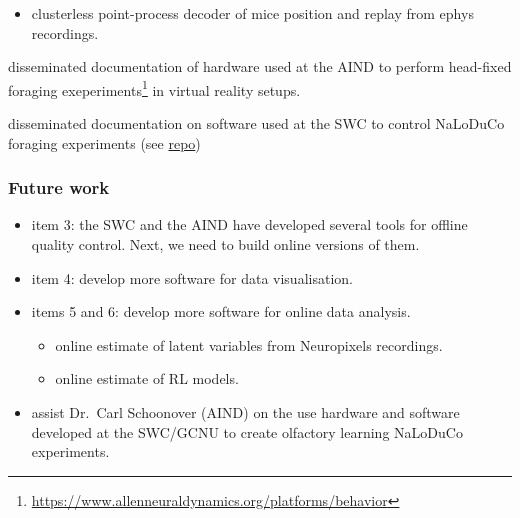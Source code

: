 \documentclass{beamer}
\begin{document}
\begin{frame}
\begin{itemize}
{\begin{itemize}
            \item clusterless point-process decoder of mice position and replay
                from ephys recordings.
    
        \end{itemize}
    
        \item  disseminated documentation of hardware used at the AIND to perform
            head-fixed foraging
            exeperiments\footnote{\url{https://www.allenneuraldynamics.org/platforms/behavior}}
            in virtual reality setups.
    
        \item  disseminated documentation on software used at the SWC to control
            NaLoDuCo foraging experiments (see
            \href{https://github.com/SainsburyWellcomeCentre/aeon_mecha.}{repo})
        }
    \end{itemize}

\end{frame}

\begin{frame}
    \frametitle{Future work}

    \begin{itemize}
   
        \item item 3: the SWC and the AIND have developed several
        tools for offline quality control. Next, we need to build online
        versions of them.

        \item item 4: develop more software for data visualisation.

        \item items 5 and 6: develop more software for online data analysis.

        \begin{itemize}

            \item online estimate of latent variables from Neuropixels
            recordings.

            \item online estimate of RL models.

        \end{itemize}

        \item assist Dr.~Carl Schoonover (AIND) on the use hardware and
        software developed at the SWC/GCNU to create olfactory learning
        NaLoDuCo experiments.

    \end{itemize}

\end{frame}
\end{document}
